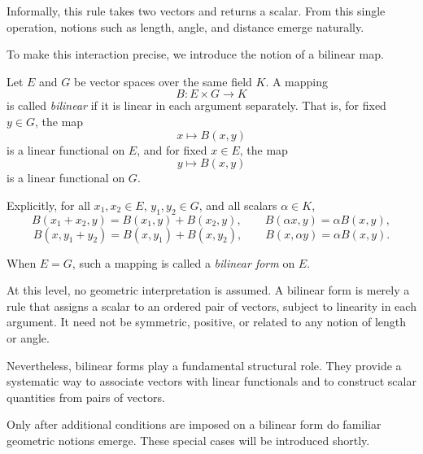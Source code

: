 \medskip

Informally, this rule takes two vectors and returns a scalar.
From this single operation, notions such as length, angle, and distance emerge
naturally.

\medskip

To make this interaction precise, we introduce the notion of a bilinear map.

\medskip

Let $E$ and $G$ be vector spaces over the same field $K$.
A mapping
\[
B : E \times G \longrightarrow K
\]
is called \emph{bilinear} if it is linear in each argument separately.
That is, for fixed $y \in G$, the map
\[
x \longmapsto B(x,y)
\]
is a linear functional on $E$, and for fixed $x \in E$, the map
\[
y \longmapsto B(x,y)
\]
is a linear functional on $G$.

\medskip

Explicitly, for all $x_1,x_2 \in E$, $y_1,y_2 \in G$, and all scalars
$\alpha \in K$,
\[
B(x_1 + x_2, y) = B(x_1, y) + B(x_2, y), \qquad
B(\alpha x, y) = \alpha B(x, y),
\]
\[
B(x, y_1 + y_2) = B(x, y_1) + B(x, y_2), \qquad
B(x, \alpha y) = \alpha B(x, y).
\]

\medskip

When $E = G$, such a mapping is called a \emph{bilinear form} on $E$.

\medskip

At this level, no geometric interpretation is assumed.
A bilinear form is merely a rule that assigns a scalar to an ordered pair of
vectors, subject to linearity in each argument.
It need not be symmetric, positive, or related to any notion of length or angle.

\medskip

Nevertheless, bilinear forms play a fundamental structural role.
They provide a systematic way to associate vectors with linear functionals
and to construct scalar quantities from pairs of vectors.

\medskip

Only after additional conditions are imposed on a bilinear form do familiar
geometric notions emerge.
These special cases will be introduced shortly.


\medskip

